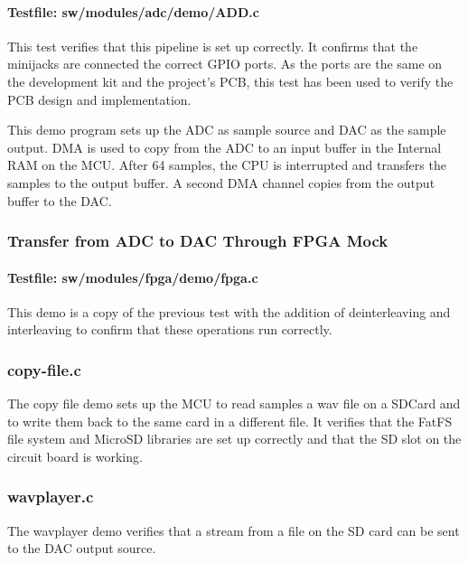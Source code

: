 \paragraph{Testfile: sw/modules/adc/demo/ADD.c}

This test verifies that this pipeline is set up correctly. It confirms that the
minijacks are connected the correct GPIO ports. As the ports are the same on the
development kit\cite{efm32gg-devkit} and the project's PCB, this test has been used to verify
the PCB design and implementation.

This demo program sets up the ADC as sample source and DAC as the sample output.
DMA is used to copy from the ADC to an input buffer in the Internal RAM on the
MCU. After 64 samples, the CPU is interrupted and transfers the samples to the
output buffer. A second DMA channel copies from the output buffer to the DAC.

\subsubsection{Transfer from ADC to DAC Through FPGA Mock}
\paragraph{Testfile: sw/modules/fpga/demo/fpga.c}

This demo is a copy of the previous test with the addition of deinterleaving and
interleaving to confirm that these operations run correctly.

\subsubsection{copy-file.c}
The copy file demo sets up the MCU to read samples a wav file on a SDCard and to write
them back to the same card in a different file. It verifies that the FatFS file system
and MicroSD libraries are set up correctly and that the SD slot on the circuit board
is working.

\subsubsection{wavplayer.c}
The wavplayer demo verifies that a stream from a file on the SD card can be sent to the
DAC output source. 
